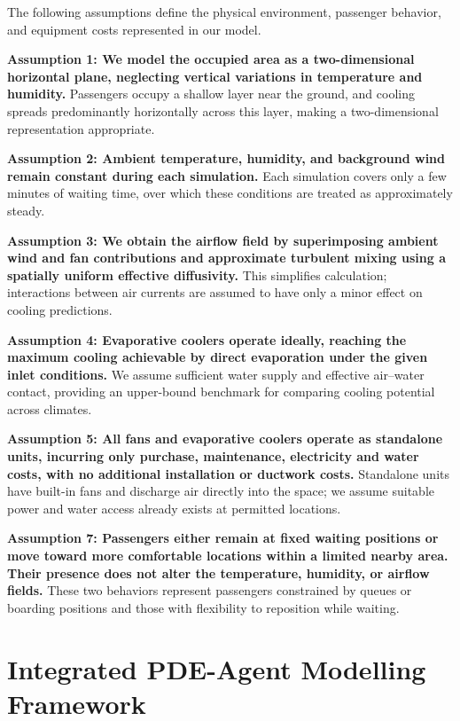 \documentclass[11pt]{article}
\begin{document}
The following assumptions define the physical environment, passenger behavior,
and equipment costs represented in our model.

\textbf{Assumption 1: We model the occupied area as a two-dimensional horizontal
plane, neglecting vertical variations in temperature and humidity.} Passengers
occupy a shallow layer near the ground, and cooling spreads predominantly
horizontally across this layer, making a two-dimensional representation appropriate.

\textbf{Assumption 2: Ambient temperature, humidity, and background wind remain
constant during each simulation.} Each simulation covers only a few minutes of
waiting time, over which these conditions are treated as approximately steady.

\textbf{Assumption 3: We obtain the airflow field by superimposing ambient wind
and fan contributions and approximate turbulent mixing using a spatially uniform
effective diffusivity.} This simplifies calculation; interactions between air
currents are assumed to have only a minor effect on cooling predictions.

\textbf{Assumption 4: Evaporative coolers operate ideally, reaching the maximum
cooling achievable by direct evaporation under the given inlet conditions.} We
assume sufficient water supply and effective air--water contact, providing an
upper-bound benchmark for comparing cooling potential across climates.

\textbf{Assumption 5: All fans and evaporative coolers operate as standalone
units, incurring only purchase, maintenance, electricity and water costs, with
no additional installation or ductwork costs.} Standalone units have built-in
fans and discharge air directly into the space; we assume suitable power and
water access already exists at permitted locations.

\textbf{Assumption 7: Passengers either remain at fixed waiting positions or move
toward more comfortable locations within a limited nearby area. Their presence
does not alter the temperature, humidity, or airflow fields.} These two behaviors
represent passengers constrained by queues or boarding positions and those with
flexibility to reposition while waiting.

\section{Integrated PDE-Agent Modelling Framework}
\end{document}
